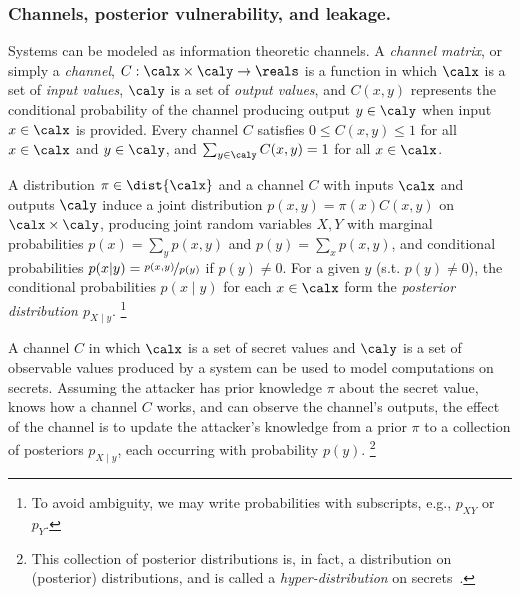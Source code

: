\subsubsection{Channels, posterior vulnerability, and leakage.}
Systems can be modeled as information
theoretic channels.
A 
\emph{channel matrix}, or simply a 
\emph{channel},
$C : \calx \times \caly \rightarrow \reals$ is a function
in which $\calx$ is a set of \emph{input values}, $\caly$ is a set 
of \emph{output values}, and $C(x,y)$ represents the conditional 
probability of the channel producing output $y \in \caly$ when 
input $x \in \calx$ is provided. 
Every channel $C$ satisfies $0 \leq C(x,y) \leq 1$ for all 
$x\in\calx$ and $y\in\caly$, and $\sum_{y\in\caly} C(x,y) = 1$ for all $x\in\calx$.

A distribution $\pi\in\dist{\calx}$ and a channel $C$ 
with inputs $\calx$ and outputs $\caly$ induce a joint distribution
$p(x,y) = \pi(x)C({x,y})$ on $\calx \times \caly$,
producing joint random variables $X, Y$ with marginal 
probabilities $p(x) = \sum_{y} p(x,y)$ and 
$p(y) = \sum_{x} p(x,y)$, and conditional probabilities 
$p(x{\mid}y) = \nicefrac{p(x,y)}{p(y)}$ if $p(y) \neq 0$. 
For a given $y$ (s.t. $p(y) \neq 0$), the conditional 
probabilities $p(x{\mid}y)$ for each $x \in \calx$ form the 
\emph{posterior distribution $p_{X \mid y}$}.%
\footnote{To avoid ambiguity, we may write probabilities
with subscripts, e.g., $p_{XY}$ or $p_{Y}$.}

A channel $C$ in which $\calx$ is a set of secret values 
and $\caly$ is a set of observable values produced
by a system can be used to model computations on secrets.
Assuming the attacker has prior knowledge $\pi$ about
the secret value, knows how a channel $C$ works, and
can observe the channel's outputs, the effect of the channel 
is to update the attacker's knowledge from a prior $\pi$ to a 
collection of posteriors $p_{X \mid y}$, each occurring 
with probability $p(y)$.%
\footnote{This collection of posterior distributions is,
in fact, a distribution on (posterior) distributions, 
and is called a \emph{hyper-distribution} on secrets~\cite{McIver:10:ICALP}.}

